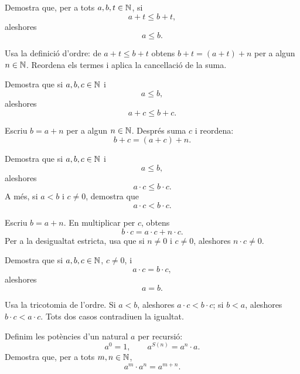 \begin{exercici}
Demostra que, per a tots \(a,b,t\in\mathbb{N}\), si
\[
a+t\leq b+t,
\]
aleshores
\[
a\leq b.
\]
\end{exercici}

\begin{indicacio}
Usa la definició d'ordre: de \(a+t\leq b+t\) obtens \(b+t=(a+t)+n\) per a algun \(n\in\mathbb{N}\). Reordena els termes i aplica la cancel\textperiodcentered{}lació de la suma.
\end{indicacio}


\begin{exercici}
Demostra que si \(a,b,c\in\mathbb{N}\) i
\[
a\leq b,
\]
aleshores
\[
a+c\leq b+c.
\]
\end{exercici}

\begin{indicacio}
Escriu \(b=a+n\) per a algun \(n\in\mathbb{N}\). Després suma \(c\) i reordena:
\[
b+c=(a+c)+n.
\]
\end{indicacio}


\begin{exercici}
Demostra que si \(a,b,c\in\mathbb{N}\) i
\[
a\leq b,
\]
aleshores
\[
a\cdot c\leq b\cdot c.
\]
A més, si \(a<b\) i \(c\neq0\), demostra que
\[
a\cdot c<b\cdot c.
\]
\end{exercici}

\begin{indicacio}
Escriu \(b=a+n\). En multiplicar per \(c\), obtens
\[
b\cdot c=a\cdot c+n\cdot c.
\]
Per a la desigualtat estricta, usa que si \(n\neq0\) i \(c\neq0\), aleshores \(n\cdot c\neq0\).
\end{indicacio}


\begin{exercici}
Demostra que si \(a,b,c\in\mathbb{N}\), \(c\neq0\), i
\[
a\cdot c=b\cdot c,
\]
aleshores
\[
a=b.
\]
\end{exercici}

\begin{indicacio}
Usa la tricotomia de l'ordre. Si \(a<b\), aleshores \(a\cdot c<b\cdot c\); si \(b<a\), aleshores \(b\cdot c<a\cdot c\). Tots dos casos contradiuen la igualtat.
\end{indicacio}


\begin{exercici}[Potències]
Definim les potències d'un natural \(a\) per recursió:
\[
a^0=1,
\qquad
a^{S(n)}=a^n\cdot a.
\]
Demostra que, per a tots \(m,n\in\mathbb{N}\),
\[
a^m\cdot a^n=a^{m+n}.
\]
\end{exercici}

